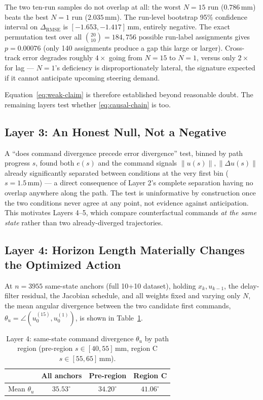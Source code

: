 \documentclass[journal]{IEEEtran}
\begin{document}
The two ten-run samples do not overlap at all: the worst $N{=}15$ run
($0.786\,\mathrm{mm}$) beats the best $N{=}1$ run
($2.035\,\mathrm{mm}$). The run-level bootstrap 95\% confidence
interval on $\Delta_{\mathrm{RMSE}}$ is $[-1.653,-1.417]\,\mathrm{mm}$,
entirely negative. The exact permutation test over all
$\binom{20}{10}=184{,}756$ possible run-label assignments gives
$p=0.00076$ (only 140 assignments produce a gap this large or
larger). Cross-track error degrades roughly $4\times$ going from
$N{=}15$ to $N{=}1$, versus only $2\times$ for lag --- $N{=}1$'s
deficiency is disproportionately lateral, the signature expected if
it cannot anticipate upcoming steering demand.

Equation~\eqref{eq:weak-claim} is therefore established beyond
reasonable doubt. The remaining layers test whether
\eqref{eq:causal-chain} is too.

\subsection{Layer 3: An Honest Null, Not a Negative}
\label{sec:ph-layer3}

A ``does command divergence precede error divergence'' test, binned
by path progress $s$, found both $e(s)$ and the command signals
$\|u(s)\|,\|\Delta u(s)\|$ already significantly separated between
conditions at the very first bin ($s=1.5\,\mathrm{mm}$) --- a direct
consequence of Layer 2's complete separation having no overlap
anywhere along the path. The test is uninformative by construction
once the two conditions never agree at any point, not evidence
against anticipation. This motivates Layers 4--5, which compare
counterfactual commands \emph{at the same state} rather than two
already-diverged trajectories.

\subsection{Layer 4: Horizon Length Materially Changes the Optimized Action}
\label{sec:ph-layer4}

At $n=3955$ same-state anchors (full 10+10 dataset), holding
$x_k,u_{k-1}$, the delay-filter residual, the Jacobian schedule, and
all weights fixed and varying only $N$, the mean angular divergence
between the two candidate first commands,
$\theta_u = \angle(u_0^{(15)},u_0^{(1)})$, is shown in
Table~\ref{tab:theta}.

\begin{table}[t]
\centering
\caption{Layer 4: same-state command divergence $\theta_u$ by path region (pre-region $s{\in}[40,55]\,\mathrm{mm}$, region C $s{\in}[55,65]\,\mathrm{mm}$).}
\label{tab:theta}
\begin{tabular}{@{}lccc@{}}
\toprule
 & All anchors & Pre-region & Region C \\
\midrule
Mean $\theta_u$ & $35.53^{\circ}$ & $34.20^{\circ}$ & $41.06^{\circ}$ \\
\bottomrule
\end{tabular}
\end{table}
\end{document}
